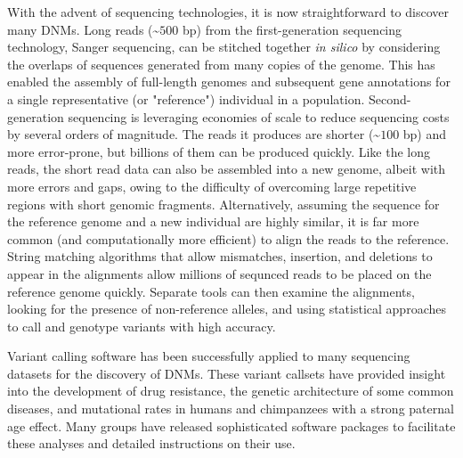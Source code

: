 With the advent of sequencing technologies, it is now straightforward to discover many DNMs.  Long reads (\textasciitilde $500$ bp) from the first-generation sequencing technology, Sanger sequencing, can be stitched together \textit{in silico} by considering the overlaps of sequences generated from many copies of the genome\cite{Myers:1995vma}.  This has enabled the assembly of full-length genomes and subsequent gene annotations for a single representative (or "reference") individual in a population.  Second-generation sequencing is leveraging economies of scale to reduce sequencing costs by several orders of magnitude\cite{Mardis:2011cr}.  The reads it produces are shorter (\textasciitilde $100$ bp) and more error-prone, but billions of them can be produced quickly.  Like the long reads, the short read data can also be assembled into a new genome, albeit with more errors and gaps, owing to the difficulty of overcoming large repetitive regions with short genomic fragments\cite{Schatz:2010if}.  Alternatively, assuming the sequence for the reference genome and a new individual are highly similar, it is far more common (and computationally more efficient) to align the reads to the reference\cite{Flicek:2009dl}.  String matching algorithms that allow mismatches, insertion, and deletions to appear in the alignments allow millions of sequnced reads to be placed on the reference genome quickly.  Separate tools can then examine the alignments, looking for the presence of non-reference alleles, and using statistical approaches to call and genotype variants with high accuracy\cite{Nielsen:2011kz}.

Variant calling software has been successfully applied to many sequencing datasets for the discovery of DNMs.  These variant callsets have provided insight into the development of drug resistance\cite{Woodford:2007it}, the genetic architecture of some common diseases\cite{Neale:2012ki}, and mutational rates in humans and chimpanzees with a strong paternal age effect\cite{Conrad:2011eh,Venn:2014ep,Kloosterman:2015cn,Francioli:2015kj}.  Many groups have released sophisticated software packages to facilitate these analyses and detailed instructions on their use\cite{DePristo:2011fo,Rimmer:2014ho}.

